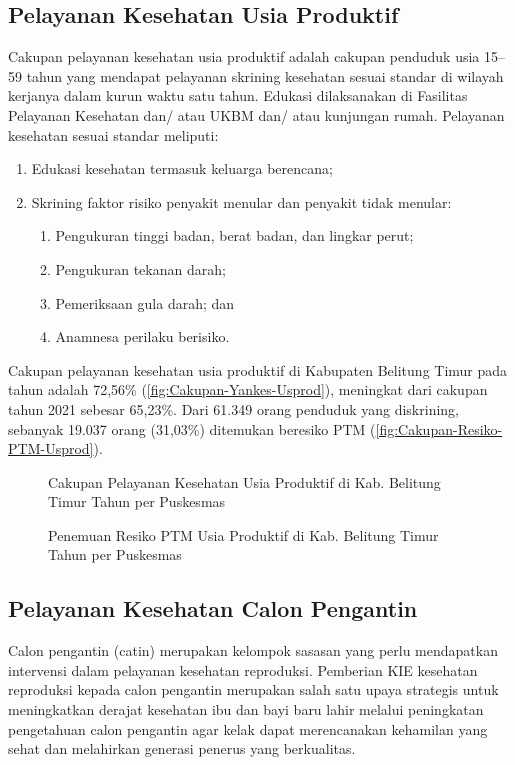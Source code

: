 \subsection{Pelayanan Kesehatan Usia Produktif}
Cakupan pelayanan kesehatan usia produktif adalah cakupan penduduk usia 15–59 tahun yang mendapat pelayanan skrining kesehatan sesuai standar di wilayah kerjanya dalam kurun waktu satu tahun. Edukasi dilaksanakan di Fasilitas Pelayanan Kesehatan dan/ atau UKBM dan/ atau kunjungan rumah. Pelayanan kesehatan sesuai standar meliputi:
\begin{enumerate}
  \item Edukasi kesehatan termasuk keluarga berencana;
  \item Skrining faktor risiko penyakit menular dan penyakit tidak menular:
  \begin{enumerate}
    \item Pengukuran tinggi badan, berat badan, dan lingkar perut;
    \item Pengukuran tekanan darah;
    \item Pemeriksaan gula darah; dan
    \item Anamnesa perilaku berisiko.
  \end{enumerate}
\end{enumerate}

Cakupan pelayanan kesehatan usia produktif di Kabupaten Belitung Timur pada tahun \tP adalah 72,56\% (\autoref{fig:Cakupan-Yankes-Usprod}), meningkat dari cakupan tahun 2021 sebesar 65,23\%.
Dari 61.349 orang penduduk yang diskrining, sebanyak 19.037 orang (31,03\%) ditemukan beresiko PTM (\autoref{fig:Cakupan-Resiko-PTM-Usprod}).

\begin{figure}[H]
    \centering
    \caption{Cakupan Pelayanan Kesehatan Usia Produktif di Kab. Belitung Timur Tahun \tP per Puskesmas}
    \label{fig:Cakupan-Yankes-Usprod}
\end{figure}

\begin{figure}[H]
    \centering
    \caption{Penemuan Resiko PTM Usia Produktif di Kab. Belitung Timur Tahun \tP per Puskesmas}
    \label{fig:Cakupan-Resiko-PTM-Usprod}
\end{figure}

\subsection{Pelayanan Kesehatan Calon Pengantin}
Calon pengantin (catin) merupakan kelompok sasasan yang perlu mendapatkan intervensi dalam pelayanan kesehatan reproduksi.
Pemberian KIE kesehatan reproduksi kepada calon pengantin merupakan salah satu upaya strategis untuk meningkatkan derajat kesehatan ibu dan bayi baru lahir melalui peningkatan pengetahuan calon pengantin agar kelak dapat merencanakan kehamilan yang sehat dan melahirkan generasi penerus yang berkualitas.

